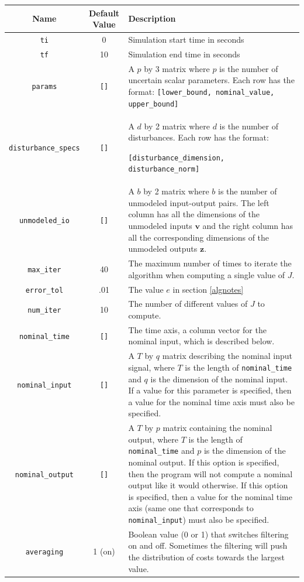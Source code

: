 \documentclass{article}
\begin{document}
\begin{table}[H]
\begin{center}
\begin{tabular}{| c | c | p{9cm} |}
\hline
\textbf{Name} & \textbf{Default Value} & \textbf{Description} \\
\hline
\texttt{ti} & 0 & Simulation start time in seconds \\
\hline 
\texttt{tf} & 10 & Simulation end time in seconds \\
\hline
\texttt{params} & \texttt{[]} & A $p$ by 3 matrix where $p$ is the number of
uncertain scalar parameters. Each row has the format:
\texttt{[lower\_bound, nominal\_value, upper\_bound]}\\
\hline
\texttt{disturbance\_specs} & \texttt{[]} & A $d$ by 2 matrix where $d$ is the
number of disturbances. Each row has the format:

\texttt{[disturbance\_dimension, disturbance\_norm]} \\
\hline
\texttt{unmodeled\_io} & \texttt{[]} & A $b$ by 2 matrix where $b$ is the number
of unmodeled input-output pairs. The left column has all the dimensions of the
unmodeled inputs $\mathbf{v}$ and the right column has all the corresponding
dimensions of the unmodeled outputs $\mathbf{z}$.\\
\hline
\texttt{max\_iter} & 40 & The maximum number of times to iterate the algorithm
when computing a single value of $J$.\\
\hline
\texttt{error\_tol} & .01 & The value $e$ in section \ref{algnotes} \\
\hline
\texttt{num\_iter} & 10 & The number of different values of $J$ to compute. \\
\hline
\texttt{nominal\_time} & \texttt{[]} & The time axis, a column vector for the
nominal input, which is described below. \\
\hline
\texttt{nominal\_input} & \texttt{[]} & A $T$ by $q$ matrix describing the
nominal input signal, where $T$ is the length of \texttt{nominal\_time} and $q$
is the dimension of the nominal input. If a value for this parameter is
specified, then a value for the nominal time axis must also be specified. \\
\hline
\texttt{nominal\_output} & \texttt{[]} & A $T$ by $p$ matrix containing the
nominal output, where $T$ is the length of \texttt{nominal\_time} and $p$ is the
dimension of the nominal output. If this option is specified, then the program
will not compute a nominal output like it would otherwise. If this option is
specified, then a value for the nominal time axis (same one that corresponds to
\texttt{nominal\_input}) must also be specified.\\
\hline
\texttt{averaging} & 1 (on) & Boolean value (0 or 1) that switches filtering on
and off. Sometimes the filtering will push the distribution of costs towards the
largest value.\\
\hline
\end{tabular}
\label{inputparameters}
\end{center}
\end{table}
\end{document}
